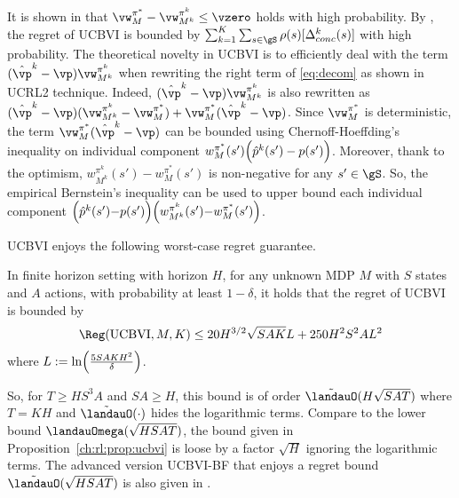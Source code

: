 It is shown in \cite{azar2017minimax} that $\vw^{\pi^*}_M- \vw^{\pi^k}_{M^k}\le \vzero$ holds with high probability.
By , the regret of UCBVI is bounded by ${\sum_{k=1}^K\sum_{s\in\gS}\rho(s)[\Delta_{conc}^k(s)]}$ with high probability.
The theoretical novelty in UCBVI is to efficiently deal with the term $(\hat{\vp}^k-\vp)\vw^{\pi^k}_{M^k}$ when rewriting the right term of \eqref{eq:decom} as shown in UCRL2 technique.
Indeed, $(\hat{\vp}^k-\vp)\vw^{\pi^k}_{M^k}$ is also rewritten as $(\hat{\vp}^k-\vp)(\vw^{\pi^k}_{M^k}-\vw^{\pi^*}_{M}) +\vw^{\pi^*}_{M}(\hat{\vp}^k-\vp)$.
Since $\vw^{\pi^*}_M$ is deterministic, the term $\vw^{\pi^*}_{M}(\hat{\vp}^k-\vp)$ can be bounded using Chernoff-Hoeffding's inequality on individual component $w^{\pi^*}_{M}(s')\Bigl(\hat{p}^k(s')-p(s')\Bigr)$.
Moreover, thank to the optimism, $w^{\pi^k}_{M^k}(s')-w^{\pi^*}_{M}(s')$ is non-negative for any $s'\in\gS$.
So, the empirical Bernstein's inequality can be used to upper bound each individual component $\Bigl(\hat{p}^k(s'){-}p(s')\Bigr)\Bigl(w^{\pi^k}_{M^k}(s'){-}w^{\pi^*}_{M}(s')\Bigr)$.

UCBVI enjoys the following worst-case regret guarantee.
\begin{prop}
    \label{ch:rl:prop:ucbvi}
    In finite horizon setting with horizon $H$, for any unknown MDP $M$ with $S$ states and $A$ actions,
    with probability at least $1-\delta$, it holds that the regret of UCBVI is bounded by
    \begin{align*}
        \Reg(\textnormal{UCBVI}, M, K) \le 20H^{3/2}\sqrt{SAK}L +250H^2S^2AL^2
    \end{align*}
    where $L:=\ln\Bigl(\frac{5SAKH^2}{\delta}\Bigr)$.
\end{prop}
So, for $T\ge HS^3A$ and $SA\ge H$, this bound is of order $\tilde{\landauO}(H\sqrt{SAT})$ where $T=KH$ and $\tilde{\landauO}(\cdot)$ hides the logarithmic terms.
Compare to the lower bound $\landauOmega(\sqrt{HSAT})$, the bound given in Proposition~\ref{ch:rl:prop:ucbvi} is loose by a factor $\sqrt{H}$ ignoring the logarithmic terms.
The advanced version UCBVI-BF that enjoys a regret bound $\tilde{\landauO}(\sqrt{HSAT})$ is also given in \cite{azar2017minimax}.%

